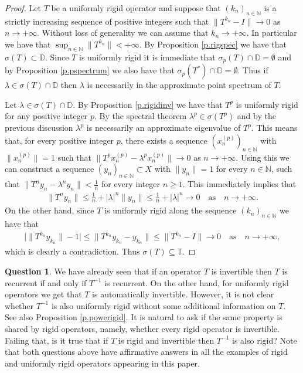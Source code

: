\documentclass[12pt,leqno]{amsart}
\theoremstyle{plain}
\theoremstyle{definition}
\newtheorem{question}[equation]{Question}
\numberwithin{equation}{section}
\begin{document}
\begin{proof} Let $T$ be a uniformly rigid operator and suppose that $(k_n)_{n\in\mathbb N}$ is a strictly increasing sequence of positive integers such that $\|T^{k_n}-I\|\to 0$ as $n\to+\infty$.  Without loss of generality we can assume that $k_n\to +\infty$.  In particular we have that $\sup_{n\in\mathbb N} \|T^{k_n}\|<+\infty$. By Proposition \ref{p.rigspec} we have that $\sigma(T)\subset \overline{\mathbb D}$. Since $T$ is uniformly rigid it is immediate that $\sigma_p(T)\cap \mathbb D=\emptyset$ and by Proposition \ref{p.pspectrum} we also have that $\sigma_p(T^*)\cap \mathbb D=\emptyset$. Thus if $\lambda \in \sigma(T)\cap \mathbb D$ then $\lambda$ is necessarily in the approximate point spectrum of $T$.

Let $\lambda \in \sigma(T)\cap \mathbb D$. By Proposition \ref{p.rigidinv} we have that $T^p$ is uniformly rigid for any positive integer $p$. By the spectral theorem $\lambda^p \in \sigma(T^p)$ and by the previous discussion $\lambda^p$ is necessarily an approximate eigenvalue of $T^p$. This means that, for every positive integer $p$, there exists a sequence $(x_n ^{(p)})_{n\in\mathbb N}$ with $\| x_n ^{(p)}\|=1$ such that 
$\|T^p x_n ^{(p)}-\lambda^p x_n ^{(p)}\|\to 0$ as $n\to+\infty$. Using this we can construct a sequence $(y_n)_{n\in\mathbb N}\subset X$ with $\|y_n\|=1$ for every $n\in\mathbb N$, such that $\|T^n y_n -\lambda^ny_n\| <\frac{1}{n}$ for every integer $n\geq 1$. This immediately implies that
\begin{align*}
\|T^n y_n\|\leq \frac{1}{n}+|\lambda|^n \|y_n\|\leq \frac{1}{n}+|\lambda|^n  \to 0 \quad \text{as} \quad n\to +\infty.
\end{align*}
On the other hand, since $T$ is uniformly rigid along the sequence $(k_n)_{n\in\mathbb N}$ we have that
\begin{align*}
 {\bigl\lvert{\|T^{k_n} y_{k_n}\|-1}\bigr\rvert}	 \leq \|T^{k_n}y_{k_n}-y_{k_n}\|\leq \|T^{k_n}-I\|  \to 0\quad \text{as}\quad n\to+\infty,
\end{align*}
which is clearly a contradiction. Thus $\sigma(T)\subseteq \mathbb T$.
\end{proof}

\begin{question} We have already seen that if an operator $T$ is invertible then $T$ is recurrent if and only if $T^{-1}$ is recurrent. On the other hand, for uniformly rigid operators we get that $T$ is automatically invertible. However, it is not clear whether $T^{-1}$ is also uniformly rigid without some additional information on $T$. See also Proposition \ref{p.powerigid}. It is natural to ask if the same property is shared by rigid operators, namely, whether every rigid operator is invertible. Failing that, is it true that if $T$ is rigid and invertible then $T^{-1}$ is also rigid? Note that both questions above have affirmative answers in all the examples of rigid and uniformly rigid operators appearing in this paper.
\end{question}
\end{document}
